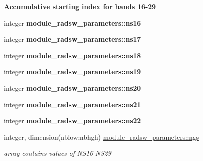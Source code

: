\begin{Indent}\textbf{ Accumulative starting index for bands 16-\/29}\par
\begin{DoxyCompactItemize}
\item 
\mbox{\label{namespacemodule__radsw__parameters_a3e6e310ecc531e2d0db52864468dc4a7}} 
integer {\bfseries module\+\_\+radsw\+\_\+parameters\+::ns16}
\item 
\mbox{\label{namespacemodule__radsw__parameters_a08303e69e406f6bb2af252b1b7dff272}} 
integer {\bfseries module\+\_\+radsw\+\_\+parameters\+::ns17}
\item 
\mbox{\label{namespacemodule__radsw__parameters_a142f7aa9f12272d721cfeae2855eec49}} 
integer {\bfseries module\+\_\+radsw\+\_\+parameters\+::ns18}
\item 
\mbox{\label{namespacemodule__radsw__parameters_ab666e8da69b308ae5b09e187b8153518}} 
integer {\bfseries module\+\_\+radsw\+\_\+parameters\+::ns19}
\item 
\mbox{\label{namespacemodule__radsw__parameters_ad63ddbb0abcaeda56220a624a62a7336}} 
integer {\bfseries module\+\_\+radsw\+\_\+parameters\+::ns20}
\item 
\mbox{\label{namespacemodule__radsw__parameters_a63b1d13965acda2c131123f67fe456ea}} 
integer {\bfseries module\+\_\+radsw\+\_\+parameters\+::ns21}
\item 
\mbox{\label{namespacemodule__radsw__parameters_a194fffaa7b04c97d8133a9e5686e94d5}} 
integer {\bfseries module\+\_\+radsw\+\_\+parameters\+::ns22}
\item 
\mbox{\label{namespacemodule__radsw__parameters_a715ab3195493dff0639da443c21e4fb5}} 
integer, dimension(nblow\+:nbhgh) \hyperlink{namespacemodule__radsw__parameters_a715ab3195493dff0639da443c21e4fb5}{module\+\_\+radsw\+\_\+parameters\+::ngs}
\begin{DoxyCompactList}\small\item\em array contains values of N\+S16-\/\+N\+S29 \end{DoxyCompactList}\item 

\end{DoxyCompactItemize}
\end{Indent}
